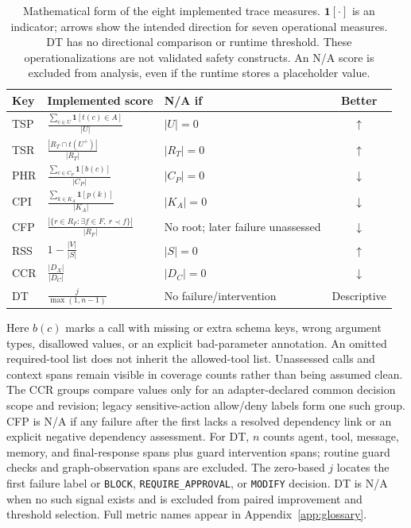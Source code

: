 \begin{table}[t]
\centering
{\renewcommand{\arraystretch}{1.18}
\begin{tabular}{@{}l>{\centering\arraybackslash}m{4.05in}>{\raggedright\arraybackslash}m{1.20in}c@{}}
\toprule
Key & Implemented score & N/A if & Better \\
\midrule
TSP & $\displaystyle\frac{\sum_{c\in U}\mathbf{1}[t(c)\in A]}{|U|}$ & $|U|=0$ & $\uparrow$ \\
TSR & $\displaystyle\frac{|R_T\cap t(U^+)|}{|R_T|}$ & $|R_T|=0$ & $\uparrow$ \\
PHR & $\displaystyle\frac{\sum_{c\in C_P}\mathbf{1}[b(c)]}{|C_P|}$ & $|C_P|=0$ & $\downarrow$ \\
CPI & $\displaystyle\frac{\sum_{k\in K_A}\mathbf{1}[p(k)]}{|K_A|}$ & $|K_A|=0$ & $\downarrow$ \\
CFP & $\displaystyle\frac{|\{r\in R_F:\exists f\in F,\ r\prec f\}|}{|R_F|}$ & No root; later failure unassessed & $\downarrow$ \\
RSS & $\displaystyle 1-\frac{|V|}{|S|}$ & $|S|=0$ & $\uparrow$ \\
CCR & $\displaystyle\frac{|D_X|}{|D_C|}$ & $|D_C|=0$ & $\downarrow$ \\
DT & $\displaystyle\frac{j}{\max(1,n-1)}$ & No failure/intervention & Descriptive \\
\bottomrule
\end{tabular}
}
\caption{Mathematical form of the eight implemented trace measures. $\mathbf{1}[\cdot]$ is an indicator; arrows show the intended direction for seven operational measures. DT has no directional comparison or runtime threshold. These operationalizations are not validated safety constructs. An N/A score is excluded from analysis, even if the runtime stores a placeholder value.}
\label{tab:metrics}
\end{table}

Here $b(c)$ marks a call with missing or extra schema keys, wrong argument types, disallowed values, or an explicit bad-parameter annotation. An omitted required-tool list does not inherit the allowed-tool list. Unassessed calls and context spans remain visible in coverage counts rather than being assumed clean. The CCR groups compare values only for an adapter-declared common decision scope and revision; legacy sensitive-action allow/deny labels form one such group. CFP is N/A if any failure after the first lacks a resolved dependency link or an explicit negative dependency assessment. For DT, $n$ counts agent, tool, message, memory, and final-response spans plus guard intervention spans; routine guard checks and graph-observation spans are excluded. The zero-based $j$ locates the first failure label or \texttt{BLOCK}, \texttt{REQUIRE\_APPROVAL}, or \texttt{MODIFY} decision. DT is N/A when no such signal exists and is excluded from paired improvement and threshold selection. Full metric names appear in Appendix~\ref{app:glossary}.

